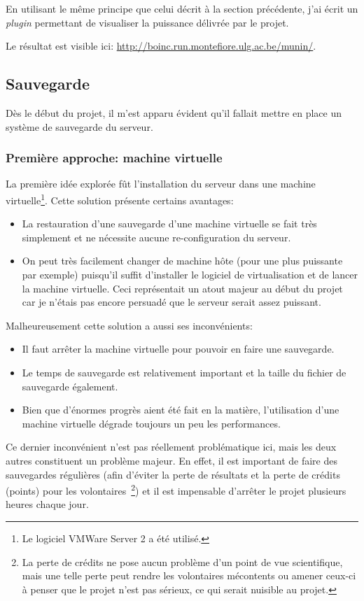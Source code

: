\documentclass[a4paper, 11pt]{report}
\begin{document}
En utilisant le même principe que celui décrit à la section précédente, j'ai écrit un \textit{plugin} permettant de visualiser la puissance délivrée par le projet.

Le résultat est visible ici: \url{http://boinc.run.montefiore.ulg.ac.be/munin/}.

\subsection{Sauvegarde}
Dès le début du projet, il m'est apparu évident qu'il fallait mettre en place un système de sauvegarde du serveur.

\subsubsection{Première approche: machine virtuelle}
La première idée explorée fût l'installation du serveur dans une machine virtuelle\footnote{Le logiciel VMWare Server 2 a été utilisé.}. %
Cette solution présente certains avantages:
\begin{itemize}
\item La restauration d'une sauvegarde d'une machine virtuelle se fait très simplement et ne nécessite aucune re-configuration du serveur.
\item On peut très facilement changer de machine hôte (pour une plus puissante par exemple) puisqu'il suffit d'installer le logiciel de virtualisation et de lancer la machine virtuelle. Ceci représentait un atout majeur au début du projet car je n'étais pas encore persuadé que le serveur serait assez puissant.
\end{itemize}
Malheureusement cette solution a aussi ses inconvénients:
\begin{itemize}
\item Il faut arrêter la machine virtuelle pour pouvoir en faire une sauvegarde.
\item Le temps de sauvegarde est relativement important et la taille du fichier de sauvegarde également.
\item Bien que d'énormes progrès aient été fait en la matière, l'utilisation d'une machine virtuelle dégrade toujours un peu les performances.
\end{itemize}
Ce dernier inconvénient n'est pas réellement problématique ici, mais les deux autres constituent un problème majeur. En effet, il est important de faire des sauvegardes régulières (afin d'éviter la perte de résultats et la perte de crédits (points) pour les volontaires~\footnote{La perte de crédits ne pose aucun problème d'un point de vue scientifique, mais une telle perte peut rendre les volontaires mécontents ou amener ceux-ci à penser que le projet n'est pas sérieux, ce qui serait nuisible au projet.}) et il est impensable d'arrêter le projet plusieurs heures chaque jour.
\end{document}
